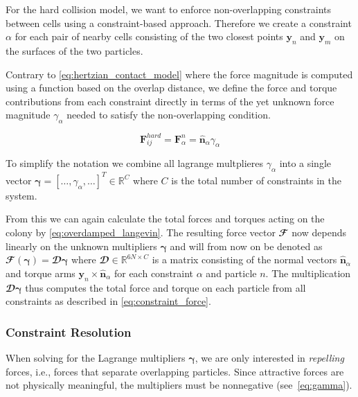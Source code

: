 \documentclass[conference]{IEEEtran}
\begin{document}
For the hard collision model, we want to enforce non-overlapping constraints between cells using a constraint-based approach. Therefore we create a constraint $\alpha$ for each pair of nearby cells consisting of the two closest points $\mathbf{y}_n$ and $\mathbf{y}_m$ on the surfaces of the two particles.

Contrary to \autoref{eq:hertzian_contact_model} where the force magnitude is computed using a function based on the overlap distance, we define the force and torque contributions from each constraint directly in terms of the yet unknown force magnitude $\gamma_\alpha$ needed to satisfy the non-overlapping condition.

\begin{equation}
    \mathbf{F}^{hard}_{ij} = \mathbf{F}_\alpha^n = \hat{\mathbf{n}}_\alpha  \gamma_\alpha
\end{equation}
\label{eq:constraint_force}

To simplify the notation we combine all lagrange multplieres $\gamma_\alpha$ into a single vector $\boldsymbol{\gamma} = [\dots, \gamma_\alpha, \dots]^T \in \mathbb{R}^{C}$ where $C$ is the total number of constraints in the system.

From this we can again calculate the total forces and torques acting on the colony by \autoref{eq:overdamped_langevin}. The resulting force vector $\mathbfcal{F}$ now depends linearly on the unknown multipliers $\boldsymbol{\gamma}$ and will from now on be denoted as $\mathbfcal{F}(\boldsymbol{\gamma}) = \mathbfcal{D}\boldsymbol{\gamma}$ where $\mathbfcal{D} \in \mathbb{R}^{6N \times C}$ is a matrix consisting of the normal vectors $\hat{\mathbf{n}}_\alpha$ and torque arms $\mathbf{y}_n \times \hat{\mathbf{n}}_\alpha$ for each constraint $\alpha$ and particle $n$. The multiplication $\mathbfcal{D}\boldsymbol{\gamma}$ thus computes the total force and torque on each particle from all constraints as described in \autoref{eq:constraint_force}.

\subsubsection{Constraint Resolution}



When solving for the Lagrange multipliers $\boldsymbol{\gamma}$, we are only interested in \emph{repelling} forces, i.e., forces that separate overlapping particles.
Since attractive forces are not physically meaningful, the multipliers must be nonnegative (see~\autoref{eq:gamma}).
\end{document}
